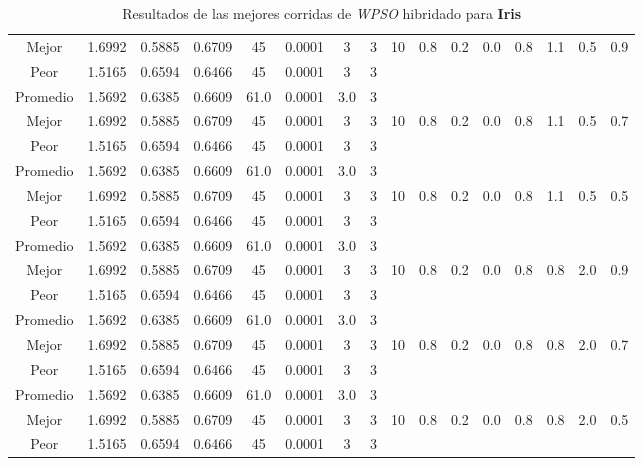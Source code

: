 \begin{table}[h!]
\begin{center}
\begin{tabular}{|c|c|c|c|c|c|c|c|c|c|c|c|c|c|c|c|}
            \cline{1-8}
            Mejor & 1.6992 & 0.5885  & 0.6709 & 45 & 0.0001 & 3 & 3 & 10 & 0.8 & 0.2 & 0.0 & 0.8 & 1.1 & 0.5 & 0.9\\
            \cline{1-8}
            Peor & 1.5165 & 0.6594  & 0.6466 & 45 & 0.0001 & 3 & 3 &  &  &  &  &  &  &  & \\
        \hline
        \hline
            Promedio  & 1.5692 & 0.6385 & 0.6609 & 61.0 & 0.0001 & 3.0 & 3 &  &  &  &  &  &  &  & \\
            \cline{1-8}
            Mejor & 1.6992 & 0.5885  & 0.6709 & 45 & 0.0001 & 3 & 3 & 10 & 0.8 & 0.2 & 0.0 & 0.8 & 1.1 & 0.5 & 0.7\\
            \cline{1-8}
            Peor & 1.5165 & 0.6594  & 0.6466 & 45 & 0.0001 & 3 & 3 &  &  &  &  &  &  &  & \\
        \hline
        \hline
            Promedio  & 1.5692 & 0.6385 & 0.6609 & 61.0 & 0.0001 & 3.0 & 3 &  &  &  &  &  &  &  & \\
            \cline{1-8}
            Mejor & 1.6992 & 0.5885  & 0.6709 & 45 & 0.0001 & 3 & 3 & 10 & 0.8 & 0.2 & 0.0 & 0.8 & 1.1 & 0.5 & 0.5\\
            \cline{1-8}
            Peor & 1.5165 & 0.6594  & 0.6466 & 45 & 0.0001 & 3 & 3 &  &  &  &  &  &  &  & \\
        \hline
        \hline
            Promedio  & 1.5692 & 0.6385 & 0.6609 & 61.0 & 0.0001 & 3.0 & 3 &  &  &  &  &  &  &  & \\
            \cline{1-8}
            Mejor & 1.6992 & 0.5885  & 0.6709 & 45 & 0.0001 & 3 & 3 & 10 & 0.8 & 0.2 & 0.0 & 0.8 & 0.8 & 2.0 & 0.9\\
            \cline{1-8}
            Peor & 1.5165 & 0.6594  & 0.6466 & 45 & 0.0001 & 3 & 3 &  &  &  &  &  &  &  & \\
        \hline
        \hline
            Promedio  & 1.5692 & 0.6385 & 0.6609 & 61.0 & 0.0001 & 3.0 & 3 &  &  &  &  &  &  &  & \\
            \cline{1-8}
            Mejor & 1.6992 & 0.5885  & 0.6709 & 45 & 0.0001 & 3 & 3 & 10 & 0.8 & 0.2 & 0.0 & 0.8 & 0.8 & 2.0 & 0.7\\
            \cline{1-8}
            Peor & 1.5165 & 0.6594  & 0.6466 & 45 & 0.0001 & 3 & 3 &  &  &  &  &  &  &  & \\
        \hline
        \hline
            Promedio  & 1.5692 & 0.6385 & 0.6609 & 61.0 & 0.0001 & 3.0 & 3 &  &  &  &  &  &  &  & \\
            \cline{1-8}
            Mejor & 1.6992 & 0.5885  & 0.6709 & 45 & 0.0001 & 3 & 3 & 10 & 0.8 & 0.2 & 0.0 & 0.8 & 0.8 & 2.0 & 0.5\\
            \cline{1-8}
            Peor & 1.5165 & 0.6594  & 0.6466 & 45 & 0.0001 & 3 & 3 &  &  &  &  &  &  &  & \\
        \hline
        \end{tabular}
        \caption{Resultados de las mejores corridas de \emph{WPSO} hibridado para {\bf Iris}}
        \label{tb:tablewpsohibcsv}
    \end{center}
\end{table}


